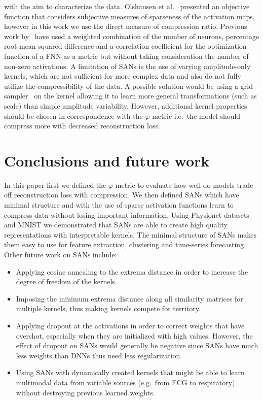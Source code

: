 \documentclass[journal]{IEEEtran}
\begin{document}
with the aim to characterize the data.
Olshausen et al.~\cite{olshausen1996emergence} presented an objective
function that considers subjective measures of sparseness of the
activation maps, however in this work we use the direct measure of
compression ratio.
Previous work by~\cite{zhang2017ecg} have used a weighted combination
of the number of neurons, percentage root-mean-squared difference and
a correlation coefficient for the optimization function of a FNN as a
metric but without taking consideration the number of non-zero activations.
A limitation of SANs is the use of varying amplitude-only kernels,
which are not sufficient for more complex data and also do not fully
utilize the compressibility of the data.
A possible solution would be using a grid
sampler~\cite{jaderberg2015spatial} on the kernel allowing it to
learn more general transformations (such as scale) than simple
amplitude variability.
However, additional kernel properties should be chosen in
correspondence with the $\varphi$ metric i.e.\ the model should
compress more with decreased reconstruction loss.
\section{Conclusions and future work}\label{sec:conclusions}
In this paper first we defined the $\varphi$ metric to evaluate how
well do models trade-off reconstruction loss with compression.
We then defined SANs which have minimal structure and with the use of
sparse activation functions learn to compress data without losing
important information.
Using Physionet datasets and MNIST we demonstrated that SANs are able
to create high quality representations with interpretable kernels.
The minimal structure of SANs makes them easy to use for feature
extraction, clustering and time-series forecasting.
Other future work on SANs include:
\begin{itemize}
  \item Applying cosine annealing to the extrema distance in order to
    increase the degree of freedom of the kernels.
  \item Imposing the minimum extrema distance along all similarity
    matrices for multiple kernels, thus making kernels compete for territory.
  \item Applying dropout at the activations in order to correct
    weights that have overshot, especially when they are initialized
    with high values.
    However, the effect of dropout on SANs would generally be
    negative since SANs have much less weights than DNNs thus need
    less regularization.
  \item Using SANs with dynamically created kernels that might be
    able to learn multimodal data from variable sources (e.g.\ from
    ECG to respiratory) without destroying previous learned weights.
\end{itemize}
\end{document}

